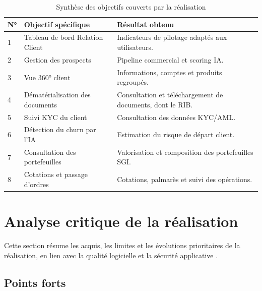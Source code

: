 \documentclass[a4paper,12pt]{report}
\begin{document}
\begin{table}[H]
\centering
\caption{Synthèse des objectifs couverts par la réalisation}
\label{tab:couverture_objectifs}
\footnotesize
\renewcommand{\arraystretch}{1.12}
\begin{tabular}{|p{0.55cm}|p{5.0cm}|p{7.05cm}|}
\hline
\textbf{N°} & \textbf{Objectif spécifique} & \textbf{Résultat obtenu} \\ \hline
1 & Tableau de bord Relation Client & Indicateurs de pilotage adaptés aux utilisateurs. \\ \hline
2 & Gestion des prospects & Pipeline commercial et scoring IA. \\ \hline
3 & Vue 360° client & Informations, comptes et produits regroupés. \\ \hline
4 & Dématérialisation des documents & Consultation et téléchargement de documents, dont le RIB. \\ \hline
5 & Suivi KYC du client & Consultation des données KYC/AML. \\ \hline
6 & Détection du churn par l'IA & Estimation du risque de départ client. \\ \hline
7 & Consultation des portefeuilles & Valorisation et composition des portefeuilles SGI. \\ \hline
8 & Cotations et passage d'ordres & Cotations, palmarès et suivi des opérations. \\ \hline
\end{tabular}
\end{table}
\newpage{}
\section{Analyse critique de la réalisation}

Cette section résume les acquis, les limites et les évolutions prioritaires de
la réalisation, en lien avec la qualité logicielle \cite{iso25010} et la
sécurité applicative \cite{owasp_asvs}.

\subsection{Points forts}
\end{document}
